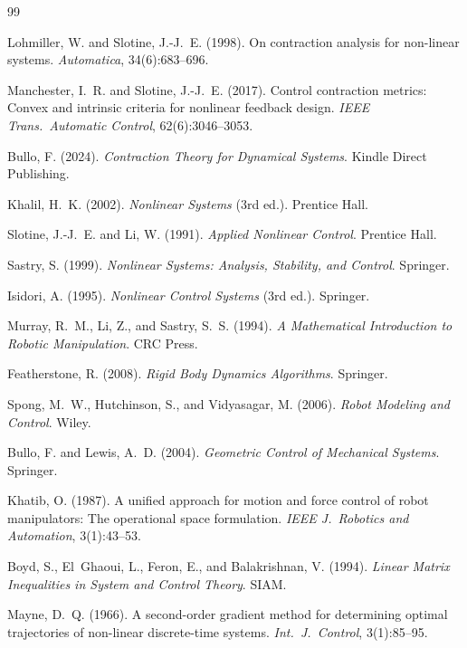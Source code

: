 \documentclass[11pt,letterpaper,openany]{book}
\theoremstyle{plain}
\theoremstyle{definition}
\theoremstyle{remark}
\begin{document}
\begin{thebibliography}{99}

Lohmiller, W. and Slotine, J.-J.~E. (1998).
On contraction analysis for non-linear systems.
\textit{Automatica}, 34(6):683--696.

Manchester, I.~R. and Slotine, J.-J.~E. (2017).
Control contraction metrics: Convex and intrinsic criteria for nonlinear feedback design.
\textit{IEEE Trans.\ Automatic Control}, 62(6):3046--3053.

Bullo, F. (2024).
\textit{Contraction Theory for Dynamical Systems}.
Kindle Direct Publishing.

Khalil, H.~K. (2002).
\textit{Nonlinear Systems} (3rd ed.).
Prentice Hall.

Slotine, J.-J.~E. and Li, W. (1991).
\textit{Applied Nonlinear Control}.
Prentice Hall.

Sastry, S. (1999).
\textit{Nonlinear Systems: Analysis, Stability, and Control}.
Springer.

Isidori, A. (1995).
\textit{Nonlinear Control Systems} (3rd ed.).
Springer.

Murray, R.~M., Li, Z., and Sastry, S.~S. (1994).
\textit{A Mathematical Introduction to Robotic Manipulation}.
CRC Press.

Featherstone, R. (2008).
\textit{Rigid Body Dynamics Algorithms}.
Springer.

Spong, M.~W., Hutchinson, S., and Vidyasagar, M. (2006).
\textit{Robot Modeling and Control}.
Wiley.

Bullo, F. and Lewis, A.~D. (2004).
\textit{Geometric Control of Mechanical Systems}.
Springer.

Khatib, O. (1987).
A unified approach for motion and force control of robot manipulators:
The operational space formulation.
\textit{IEEE J.\ Robotics and Automation}, 3(1):43--53.

Boyd, S., El~Ghaoui, L., Feron, E., and Balakrishnan, V. (1994).
\textit{Linear Matrix Inequalities in System and Control Theory}.
SIAM.

Mayne, D.~Q. (1966).
A second-order gradient method for determining optimal trajectories
of non-linear discrete-time systems.
\textit{Int.\ J.\ Control}, 3(1):85--95.


\end{thebibliography}
\end{document}
